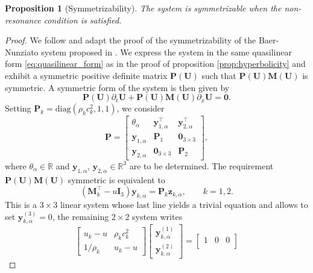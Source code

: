 \documentclass{myclass}
\newtheorem{proposition}{\bf Proposition}[section]
\newcommand{\mtrx}[1]{\mathbf{#1}}
\newcommand{\pth}[1]  {\left( #1 \right)}
\begin{document}
\begin{proposition}[Symmetrizability]\label{prop:symmetrization}
 The system is symmetrizable when the non-resonance condition is satisfied.
\end{proposition}
\begin{proof}
We follow and adapt the proof of the symmetrizability of the Baer-Nunziato system proposed in \cite{coquel:2013}. We express the system in the same quasilinear form \eqref{eq:quasilinear_form} as in the proof of proposition \ref{prop:hyperbolicity} and exhibit a symmetric positive definite matrix $\mtrx{P}(\bm{U})$ such that $\mtrx{P}(\bm{U})\mtrx{M}(\bm{U})$ is symmetric. A symmetric form of the system is then given by
\begin{equation}
\mtrx{P}(\bm{U})\partial_t\bm{U} + \mtrx{P}(\bm{U})\mtrx{M}(\bm{U})\partial_x\bm{U}=\bm{0}.
\end{equation}
Setting $\mtrx{P}_k = \mathrm{diag}(\rho_k c_k^2,1,1)$, we consider 
\begin{equation}
\mtrx{P} = \begin{bmatrix}
 \theta_{\alpha} & \bm{y}_{1,\alpha}^\top & \bm{y}_{2,\alpha}^\top \\
 \bm{y}_{1,\alpha} & \mtrx{P}_1 & \bm{0}_{3\times3}\\
 \bm{y}_{2,\alpha} & \bm{0}_{3\times3} & \mtrx{P}_2
 \end{bmatrix},
\end{equation}
where $\theta_\alpha\in\mathbb{R}$ and $\bm{y}_{1,\alpha},\,\bm{y}_{2,\alpha}\in\mathbb{R}^3$ are to be determined. The requirement $\mtrx{P}(\bm{U})\mtrx{M}(\bm{U})$ symmetric is equivalent to
\begin{equation}
\pth{\mtrx{M}_k^\top - u\mtrx{I}_3}\bm{y}_{k,\alpha} = \mtrx{P}_k\bm{z}_{k,\alpha}, \qquad k=1,2.
\end{equation}
This is a $3\times3$ linear system whose last line yields a trivial equation and allows to set $\bm{y}_{k,\alpha}^{(3)}=0$, the remaining $2\times2$ system writes
\begin{equation}
\begin{bmatrix}
u_k- u & \rho_k c_k^2 \\
1/\rho_k & u_k - u
\end{bmatrix}
\begin{bmatrix}
\bm{y}_{k,\alpha}^{(1)}\\
\bm{y}_{k,\alpha}^{(2)}
\end{bmatrix}
= \begin{bmatrix}
1 & 0 & 0\\

\end{bmatrix}
\end{equation}
\end{proof}
\end{document}
